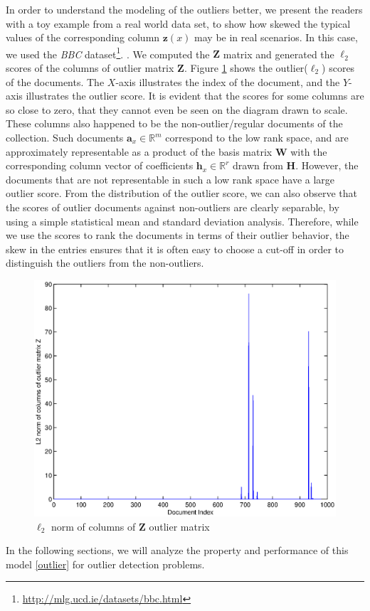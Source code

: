 In order to understand the modeling of the outliers better, we
present the readers with a toy example from a real world data set,
to show how  skewed the typical values of the corresponding column
$\mathbf{z}(x)$ may be in real scenarios.  In this case, we used the
{\em BBC} dataset\footnote{\url{http://mlg.ucd.ie/datasets/bbc.html}}.
. 
We computed the $\mathbf{Z}$ matrix
and   generated the $\ell_2$ scores of the columns of outlier matrix
$\mathbf{Z}$. Figure \ref{fig:outlierz} shows the outlier($\ell_2$)
scores of the documents. The $X$-axis illustrates the index of the
document, and the $Y$-axis illustrates the outlier score. It is
evident that  the scores for some  columns are so close to zero,
that they cannot even be seen on the diagram drawn to scale. These
columns also happened to be the non-outlier/regular documents of the collection.
Such documents $\mathbf{a}_x \in \mathbb{R}^m$ correspond to the low
rank space, and  are approximately representable as  a product of
the basis  matrix $\mathbf{W}$ with the corresponding column vector
of coefficients $\mathbf{h}_x \in \mathbb{R}^r$ drawn from
$\mathbf{H}$. However, the documents that are not representable in
such a low rank space have a large outlier score. From the
distribution of the outlier score, we can also observe that the
scores of outlier documents against non-outliers are clearly
separable, by using a simple statistical mean and standard deviation
analysis. Therefore, while we use the scores to rank the documents
in terms of their outlier behavior, the skew in the entries ensures
that it is often easy to choose a cut-off in order to distinguish
the outliers from the non-outliers.

\begin{figure}
\includegraphics[scale=0.4]{outlierzbbc.eps}
\caption{$\ell_2$ norm of columns of $\mathbf{Z}$ outlier matrix}
\label{fig:outlierz}
\end{figure}



In the following sections, we will analyze the property and
performance of this model \eqref{outlier} for outlier detection
problems.
